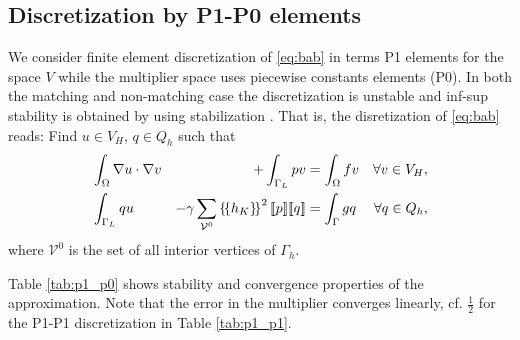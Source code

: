 \documentclass[r]{siamart171218}
\begin{document}
\subsection{Discretization by P1-P0 elements}\label{sec:p1_p0}
We consider finite element discretization of \eqref{eq:bab} in terms P1 elements
for the space $V$ while the multiplier space uses piecewise constants elements
(P0). In both the matching and non-matching case the discretization is unstable
and inf-sup stability is obtained by using stabilization \cite{burman2014projection}.
That is, the disretization of \eqref{eq:bab} reads: Find $u\in V_H$, $q\in Q_h$ such that
%
\begin{equation}\label{eq:p0_stab}
\begin{aligned}
&\int_{\Omega} \nabla u\cdot \nabla v &+ \int_{\Gamma_L}p v &= \int_{\Omega} f v &\forall v\in V_H,\\
  &\int_{\Gamma_L}q u  &-\gamma \sum_{\mathcal{V}^0} \avg{h_K}^2\jump{p}\jump{q} &= \int_{\Gamma} g q &\forall q\in Q_h,
  \end{aligned}
\end{equation}
%
where $\mathcal{V}^0$ is the set of all interior vertices of $\Gamma_h$.

Table \ref{tab:p1_p0} shows stability and convergence properties of the approximation.
Note that the error in the multiplier converges linearly, cf. $\tfrac{1}{2}$ for
the P1-P1 discretization in Table \ref{tab:p1_p1}.
\end{document}
